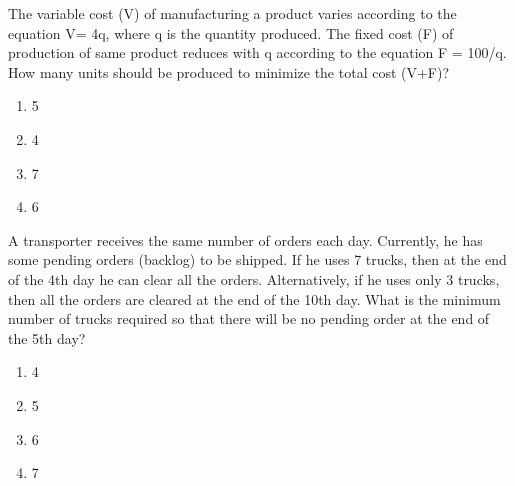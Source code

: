 \item The variable cost ({V}) of manufacturing a product varies according to the equation V= 4q, where q is the quantity produced. The fixed cost (F) of production of same product reduces with q according to the equation F = 100/q. How many units should be produced to minimize the total cost (V+F)?
\begin{enumerate}
    \item 5
    \item 4
    \item 7
    \item 6
\end{enumerate}
\item  A transporter receives the same number of orders each day. Currently, he has some pending orders (backlog) to be shipped. If he uses 7 trucks, then at the end of the 4th day he can clear all the orders. Alternatively, if he uses only 3 trucks, then all the orders are cleared at the end of the 10th day. What is the minimum number of trucks required so that there will be no pending order at the end of the 5th day?
\begin{enumerate}
    \item 4
    \item 5
    \item 6
    \item 7
\end{enumerate}

